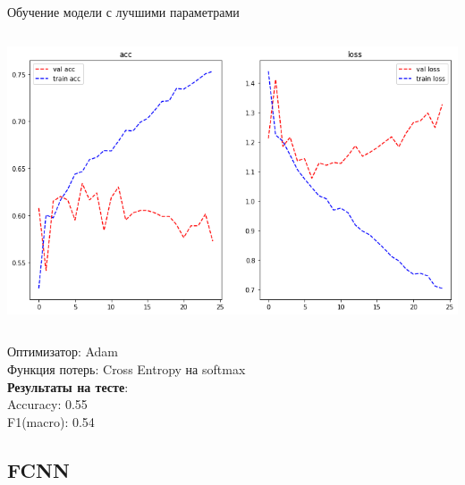 \documentclass[c, aspectratio = 43]{beamer}
\begin{document}
    \begin{frame}{Обучение модели с лучшими параметрами}
        \begin{columns}
            \includegraphics[width=\linewidth]{rnn_train.png}
        	\begin{table}[]
        	\end{table}
        \end{columns}
        Оптимизатор: Adam\\
        Функция потерь: Cross Entropy на softmax\\
        \textbf{Результаты на тесте}:\\
        Accuracy: 0.55\\
        F1(macro): 0.54
        \end{frame}


 \subsection{FCNN}
\end{document}
